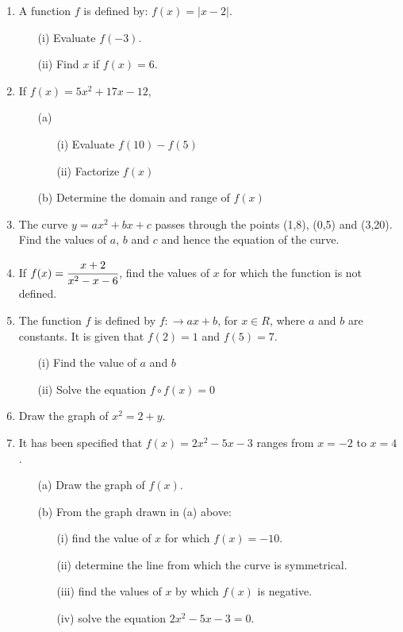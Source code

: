 \begin{enumerate}
	\item A function $f$ is defined by: $f(x) = |x - 2|$.
		\begin{itemize}
		\item[(i)] Evaluate $f(-3)$.
		\item[(ii)] Find $x$ if $f(x) = 6$.
		\end{itemize}		 
		
	\item If $f(x) = 5x^2 + 17x - 12$,
		\begin{itemize}
		\item[(a)]
			\begin{itemize}
			\item[(i)] Evaluate $f(10) - f(5)$
			\item[(ii)] Factorize $f(x)$
			\end{itemize}
		\item[(b)] Determine the domain and range of $f(x)$
		\end{itemize}
		
	\item The curve $y = ax^2 + bx + c$ passes through the points (1,8), (0,5) and (3,20). Find the values of $a$, $b$ and $c$ and hence the equation of the curve.
	
	\item If $f(x) = \cfrac{x + 2}{x^2 - x- 6}$, find the values of $x$ for which the function is not defined.
	
	\item The function $f$ is defined by $f: \rightarrow ax + b$, for $x \in R$, where $a$ and $b$ are constants. It is given that $f(2) = 1$ and $f(5) = 7$.
		\begin{itemize}
		\item[(i)] Find the value of $a$ and $b$
		\item[(ii)] Solve the equation $f \circ f(x) = 0$
		\end{itemize}
		
	\item Draw the graph of $x^2 = 2 + y$.
	
	\item It has been specified that $f(x) = 2x^2 - 5x - 3$ ranges from $x = -2$ to $x = 4$.
		\begin{itemize}
		\item[(a)] Draw the graph of $f(x)$.
		\item[(b)] From the graph drawn in (a) above:
			\begin{itemize}
			\item[(i)] find the value of $x$ for which $f(x) = -10$.
			\item[(ii)] determine the line from which the curve is symmetrical.
			\item[(iii)] find the values of $x$ by which $f(x)$ is negative.
			\item[(iv)] solve the equation $2x^2 - 5x - 3 = 0$.
			\end{itemize}
		\end{itemize}


\end{enumerate}
